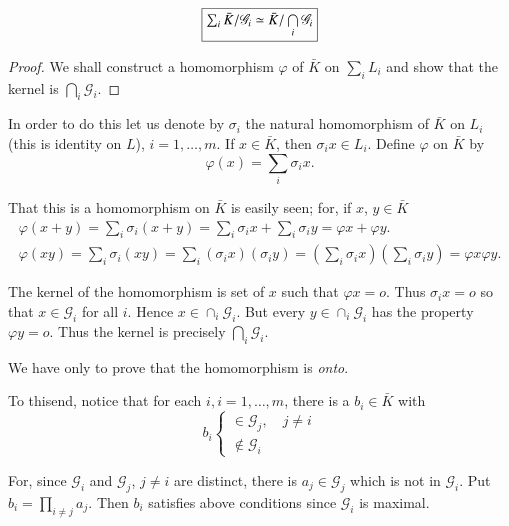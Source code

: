 \begin{thm}\label{c5:thm6}%
$$
\fbox{$\sum_i  \bar{K}/\mathscr{G}_i  \simeq  \bar{K}/
  \bigcap\limits_i  \mathscr{G}_i$} 
$$
\end{thm}

\begin{proof}%
We shall construct a homomorphism $\varphi$ of $\bar{K}$ on $\sum_i
L_i$ and show that the kernel is $\bigcap\limits_i  \mathscr{G}_i$. 
\end{proof}

In order to do this let us denote by $\sigma_i$ the natural
homomorphism of $\bar{K}$ on $L_i$ (this is identity on $L$), $i = 1,
\ldots, m$. If $x  \in  \bar{K}$, then $\sigma_i  x  \in  L_i$. Define
$\varphi$ on $\bar{K}$ by 
$$
\varphi(x) = \sum_i  \sigma_i  x.
$$
 
That this is a homomorphism on $\bar{K}$ is easily seen; for, if $x$, $y
\in  \bar{K}$ 
\begin{gather*}
\varphi(x+y) = \sum_i  \sigma_i(x+y) = \sum_i  \sigma_i  x + \sum_i
\sigma_i  y = \varphi x + \varphi y.\\ 
\varphi(x  y) = \sum_i  \sigma_i (x  y) = \sum_i  (\sigma_i  x)
(\sigma_i y) = (\sum_i  \sigma_i  x) (\sum_i \sigma_i  y) = \varphi
x  \varphi  y. 
\end{gather*} 
 
The kernel of the homomorphism is set of $x$ such that $\varphi  x =
o$. Thus $\sigma_i  x = o$ so that $x \in  \mathscr{G}_i$ for all
$i$. Hence $x  \in  \cap_i \mathscr{G}_i$. But every  $y  \in  \cap_i
\mathscr{G}_i$ has the property $\varphi  y = o$. Thus the kernel is
precisely $\bigcap\limits_i  \mathscr{G}_i$. 

We have only to prove that the homomorphism is \textit{onto}.

To this\pageoriginale end, notice that for each $i,i = 1,\ldots, m$,
there is a $b_i \in  \bar{K}$ with   
\begin{equation*}
b_i
\begin{cases}
\in  \mathscr{G}_j, \quad j \neq i\\
\notin  \mathscr{G}_i
\end{cases}
\end{equation*}

For, since $\mathscr{G}_i$ and $\mathscr{G}_j$, $j \neq i$ are distinct,
there is $a_j  \in  \mathscr{G}_j$ which is not in
$\mathscr{G}_i$. Put $b_i = \prod\limits_{i  \neq  j}  a_j$. Then
$b_i$ satisfies above conditions since $\mathscr{G}_i$ is maximal. 

